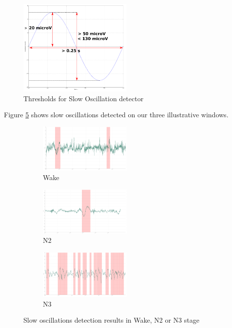 \documentclass[12pt]{report}
\begin{document}
\begin{figure}[H]
\centering
\includegraphics[width=0.5\textwidth]{img/chap2/so_detect.png}
\caption{\label{fig:so_detect}Thresholds for Slow Oscillation detector}
\end{figure}

Figure \ref{fig:3windows_so} shows slow oscillations detected on our three illustrative windows.

\begin{figure}[H]
\begin{subfigure}{1.\textwidth}
	\centering
	\includegraphics[width=0.5\textwidth]{img/chap2/wake_sob.png}
	\caption{Wake}
	\label{fig:wake_window_so}
\end{subfigure}

\begin{subfigure}{1.\textwidth}
	\centering
	\includegraphics[width=0.5\textwidth]{img/chap2/n2_sob.png}
	\caption{N2}
	\label{fig:n2_window_so}
\end{subfigure}

\begin{subfigure}{1.\textwidth}
	\centering
	\includegraphics[width=0.5\textwidth]{img/chap2/n3_sob.png}
	\caption{N3}
	\label{fig:n3_window_so}
\end{subfigure}

\caption{\label{fig:3windows_so}Slow oscillations detection results in Wake, N2 or N3 stage}
\end{figure}
\end{document}
